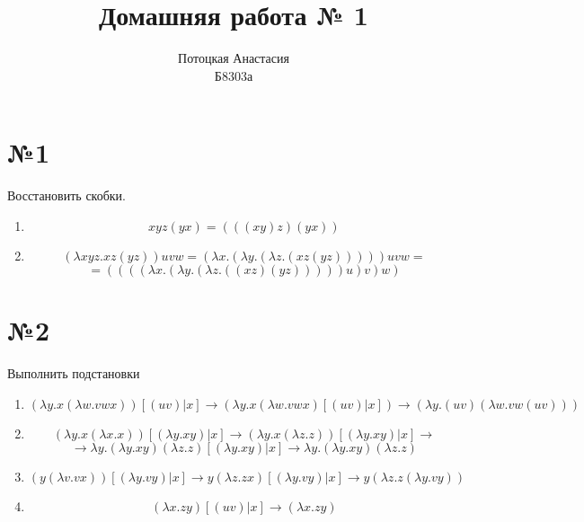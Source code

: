 \documentclass[a4paper,14pt]{scrreprt}
\title{Домашняя работа № 1}
\author{Потоцкая Анастасия\\Б8303а}
\newcommand{\lmd}{\lambda}
\begin{document}
\maketitle

\section*{№1}
Восстановить скобки.
\begin{enumerate}
\item
$$ xyz(yx) = (((xy)z)(yx))$$
\item
$$ (\lmd xyz.xz(yz))uvw = (\lmd x.(\lmd y.(\lmd z.(xz(yz)))))uvw = $$
$$ = ((((\lmd x.(\lmd y.(\lmd z.((xz)(yz)))))u)v)w) $$
\end{enumerate}

\section*{№2}
Выполнить подстановки
\begin{enumerate}
	\item 
		$$ (\lmd y.x(\lmd w.vwx))[(uv)|x] \to (\lmd y.x(\lmd w.vwx)[(uv)|x]) \to (\lmd y.(uv)(\lmd w.vw(uv))) $$
	\item 
		$$(\lmd y.x(\lmd x.x))[(\lmd y.xy)|x] \to (\lmd y.x(\lmd z.z))[(\lmd y.xy)|x] \to $$
		$$ \to \lmd y.(\lmd y.xy)(\lmd z.z)[(\lmd y.xy)|x] \to \lmd y.(\lmd y.xy)(\lmd z.z) $$
	\item 
		$$ (y(\lmd v.vx))[(\lmd y.vy)|x] \to y(\lmd z.zx)[(\lmd y.vy)|x] \to y(\lmd z.z(\lmd y.vy))$$
	\item 
		$$ (\lmd x.zy)[(uv)|x]\to(\lmd x.zy) $$
\end{enumerate}
\end{document}
